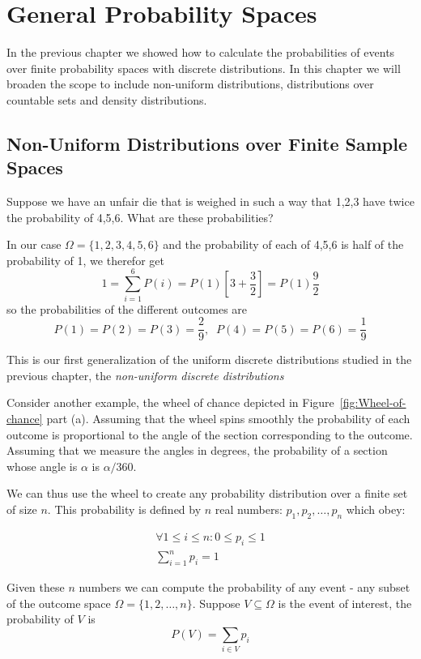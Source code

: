 \chapter{General Probability Spaces}

In the previous chapter we showed how to calculate the probabilities
of events over finite probability spaces with discrete
distributions. In this chapter we will broaden the scope to include
non-uniform distributions, distributions over countable sets and
density distributions.

\section{Non-Uniform Distributions over Finite Sample Spaces}

Suppose we have an unfair die that is weighed in such a way that 1,2,3
have twice the probability of 4,5,6. What are these probabilities?

In our case $\Omega=\{1,2,3,4,5,6\}$ and the probability of each of
4,5,6 is half of the probability of 1, we therefor get
\[
1=\sum_{i=1}^6 P(i)=P(1)[3+\frac{3}{2}]=P(1)\frac{9}{2}
\]
so the probabilities of the different outcomes are 
\[ 
P(1)=P(2)=P(3)=\frac{2}{9},\;\; P(4)=P(5)=P(6)=\frac{1}{9}
\]

This is our first generalization of the uniform discrete
distributions studied in the previous chapter, the {\em non-uniform
  discrete distributions}

Consider another example, the wheel of chance depicted in
Figure~\ref{fig:Wheel-of-chance} part (a). Assuming that the wheel spins
smoothly the probability of each outcome is proportional to the angle
of the section corresponding to the outcome. Assuming that we measure
the angles in degrees, the probability of a section whose angle is
$\alpha$ is $\alpha/360$.

We can thus use the wheel to create any probability distribution over
a finite set of size $n$. This probability is defined by $n$ real numbers:
$p_1,p_2,\ldots,p_n$ which obey:

\begin{eqnarray}
\forall 1 \leq i \leq n: 0 \leq p_i \leq 1 \\
\sum_{i=1}^n p_i =1
\end{eqnarray}

Given these $n$ numbers we can compute the probability of any event -
any subset of the outcome space $\Omega=\{1,2,\ldots,n\}$. 
Suppose $V \subseteq \Omega$ is the event of interest, the probability
of $V$ is
\begin{equation}
P(V)=\sum_{i \in V} p_i
\end{equation}


